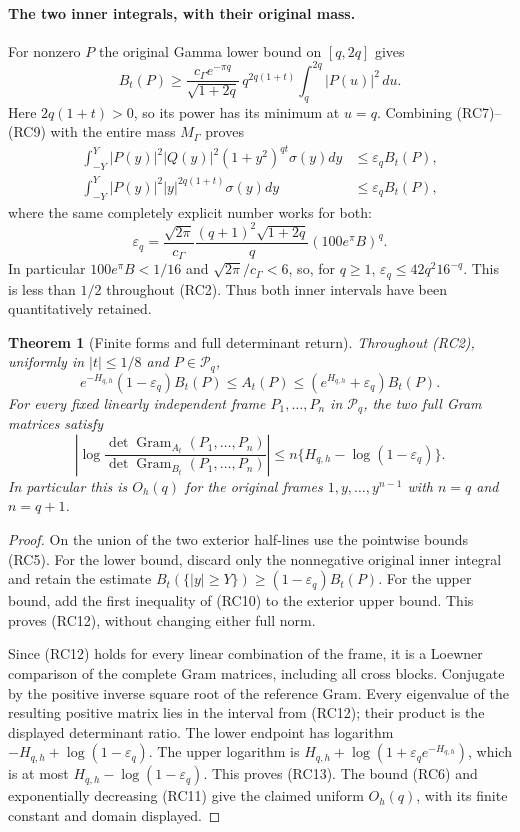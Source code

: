 \documentclass[11pt,a4paper]{article}
\newtheorem{theorem}{Theorem}[section]
\begin{document}
\paragraph{The two inner integrals, with their original mass.}
For nonzero $P$ the original Gamma lower bound on $[q,2q]$ gives
\[
 B_t(P)\geq
 \frac{c_\Gamma e^{-\pi q}}{\sqrt{1+2q}}\,
 q^{2q(1+t)}\int_q^{2q}|P(u)|^2\,du.              \tag{RC9}
\]
Here $2q(1+t)>0$, so its power has its minimum at $u=q$.
Combining (RC7)--(RC9) with the entire mass $M_\Gamma$ proves
\[
 \begin{split}
 \int_{-Y}^Y|P(y)|^2|Q(y)|^2(1+y^2)^{qt}\sigma(y)dy
       &\leq\varepsilon_q B_t(P),\\
 \int_{-Y}^Y|P(y)|^2|y|^{2q(1+t)}\sigma(y)dy
       &\leq\varepsilon_q B_t(P),
 \end{split}                                    \tag{RC10}
\]
where the same completely explicit number works for both:
\[
 \varepsilon_q=
 \frac{\sqrt{2\pi}}{c_\Gamma}
 \frac{(q+1)^2\sqrt{1+2q}}{q}
          \left(100e^\pi B\right)^q.             \tag{RC11}
\]
In particular $100e^\pi B<1/16$ and
$\sqrt{2\pi}/c_\Gamma<6$, so, for $q\geq1$,
$\varepsilon_q\leq42q^2 16^{-q}$.
This is less than $1/2$ throughout (RC2).
Thus both inner intervals have been quantitatively retained.

\begin{theorem}[Finite forms and full determinant return]
Throughout (RC2), uniformly in $|t|\leq1/8$ and
$P\in\mathcal P_q$,
\[
 e^{-H_{q,h}}(1-\varepsilon_q)B_t(P)
 \leq A_t(P)\leq(e^{H_{q,h}}+\varepsilon_q)B_t(P).
 \tag{RC12}
\]
For every fixed linearly independent frame $P_1,\ldots,P_n$
in $\mathcal P_q$, the two full Gram matrices satisfy
\[
 \left|\log
 \frac{\det\operatorname{Gram}_{A_t}(P_1,\ldots,P_n)}
      {\det\operatorname{Gram}_{B_t}(P_1,\ldots,P_n)}
 \right|
 \leq n\{H_{q,h}-\log(1-\varepsilon_q)\}.
 \tag{RC13}
\]
In particular this is $O_h(q)$ for the original frames
$1,y,\ldots,y^{n-1}$ with $n=q$ and $n=q+1$.
\end{theorem}
\begin{proof}
On the union of the two exterior half-lines use the pointwise bounds
(RC5). For the lower bound, discard only the nonnegative original inner
integral and retain the estimate
$B_t(\{|y|\geq Y\})\geq(1-\varepsilon_q)B_t(P)$.
For the upper bound, add the first inequality of (RC10) to the exterior
upper bound. This proves (RC12), without changing either full norm.

Since (RC12) holds for every linear combination of the frame, it is a
Loewner comparison of the complete Gram matrices, including all cross
blocks. Conjugate by the positive inverse square root of the reference
Gram. Every eigenvalue of the resulting positive matrix lies in the
interval from (RC12); their product is the displayed determinant ratio.
The lower endpoint has logarithm
$-H_{q,h}+\log(1-\varepsilon_q)$.
The upper logarithm is
$H_{q,h}+\log(1+\varepsilon_q e^{-H_{q,h}})$, which is at most
$H_{q,h}-\log(1-\varepsilon_q)$.
This proves (RC13).
The bound (RC6) and exponentially decreasing (RC11) give the claimed
uniform $O_h(q)$, with its finite constant and domain displayed.
\end{proof}
\end{document}
